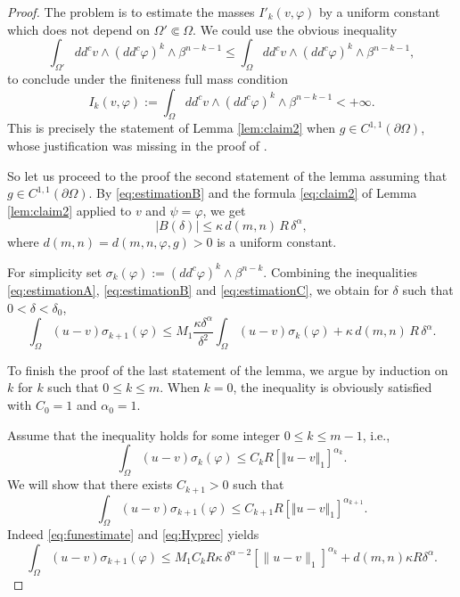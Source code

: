 \documentclass[11pt]{article}
\newcommand{\ie}{i.e.,\xspace}
\numberwithin{equation}{section}
\theoremstyle{definition}
\theoremstyle{plain}
\theoremstyle{definition}
\begin{document}
\begin{proof}
The problem is to estimate the masses $I'_k (v,\varphi) $ by a uniform constant which does not depend on $\Omega' \Subset \Omega$.
We could use the obvious inequality
\[
\int_{\Omega'} dd^c v \wedge(dd^c\varphi)^k\wedge\beta^{n-k-1} \leq \int_{\Omega} dd^c v \wedge(dd^c\varphi)^k\wedge\beta^{n-k-1},
\]
to conclude under the finiteness full mass condition
\[ I_k (v,\varphi) := \int_{\Omega} dd^c v \wedge(dd^c\varphi)^k\wedge\beta^{n-k-1}< + \infty.\]
This is precisely the statement of Lemma \ref{lem:claim2} when $g \in C^{1,1} (\partial \Omega)$, whose justification was missing in the proof of \cite[Lem.\,4.2]{BZ20}.

So let us proceed to the proof the second statement of the lemma assuming that $g \in C^{1,1} (\partial \Omega)$.
By \eqref{eq:estimationB} and the formula \eqref{eq:claim2} of Lemma \ref{lem:claim2} applied to $v$ and $\psi = \varphi$, we get
\begin{equation} \label{eq:estimationC}
|B (\delta)| \leq \kappa \, d(m,n) \, R \, \delta^{\alpha},
\end{equation}
where $d(m,n) = d(m,n,\varphi,g) >0$ is a uniform constant.

For simplicity set $ \sigma_{k }(\varphi) := (dd^c \varphi)^k \wedge \beta^{n - k}.$ Combining the inequalities \eqref{eq:estimationA}, \eqref{eq:estimationB} and \eqref{eq:estimationC}, we obtain for $\delta$ such that $0 < \delta < \delta_0$,
\begin{equation} \label{eq:funestimate}
\int_{\Omega}(u-v) \sigma_{k +1}(\varphi)\leq M_1 \frac{\kappa \delta^\alpha}{\delta^2} \int_{\Omega} (u-v) \sigma_{k }(\varphi) + \kappa \, d(m,n) \, R \, \delta^{\alpha}.
\end{equation}

To finish the proof of the last statement of the lemma, we argue by induction on~$k$ for $k$ such that $0 \leq k \leq m$.
When $k=0$, the inequality is obviously satisfied with $C_0 = 1$ and $\alpha_0 = 1$.

Assume that the inequality holds for some integer $0 \leq k\leq m - 1$, \ie
\begin{equation}\label{eq:Hyprec}
\int_{\Omega}( u-v) \sigma_k{(\varphi)}\leq C_{k} R[\Vert u-v \Vert_1]^{\alpha_k}.
\end{equation}
We will show that there exists $C_{k+1} > 0$ such that
\[
\int_{\Omega}(u-v) \sigma_{k+1}(\varphi)\leq C_{k+1} R[\Vert u-v \Vert_1]^{\alpha_{k+1}}.
\]
Indeed \eqref{eq:funestimate} and \eqref{eq:Hyprec} yields
\[
\int_{\Omega}(u-v) \sigma_{k+1}(\varphi)\leq
M_1 C_k R \kappa \, \delta^{\alpha - 2} [\|u-v\|_1]^{\alpha_k} + d(m,n) \kappa R \delta^{\alpha}.
\]


\end{proof}
\end{document}
